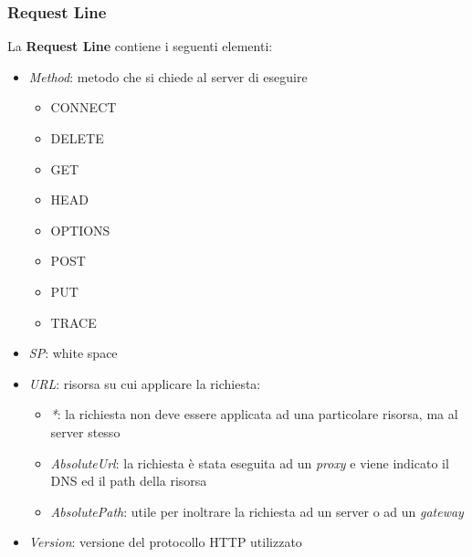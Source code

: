 \documentclass[a4paper,11pt]{article}
\begin{document}
\subsubsection{Request Line}
La \textbf{Request Line} contiene i seguenti elementi:
\begin{itemize}
    \item \textit{Method}: metodo che si chiede al server di eseguire
    \begin{itemize}
        \item CONNECT
        \item DELETE
        \item GET
        \item HEAD
        \item OPTIONS
        \item POST
        \item PUT
        \item TRACE
    \end{itemize}
    \item \textit{SP}: white space
    \item \textit{URL}: risorsa su cui applicare la richiesta:
    \begin{itemize}
        \item \textit{*}: la richiesta non deve essere applicata ad una particolare risorsa, ma al server stesso
        \item \textit{AbsoluteUrl}: la richiesta è stata eseguita ad un \textit{proxy} e viene indicato il DNS ed il path della risorsa
        \item \textit{AbsolutePath}: utile per inoltrare la richiesta ad un server o ad un \textit{gateway}
    \end{itemize}
    \item \textit{Version}: versione del protocollo HTTP utilizzato
\end{itemize}
\end{document}
